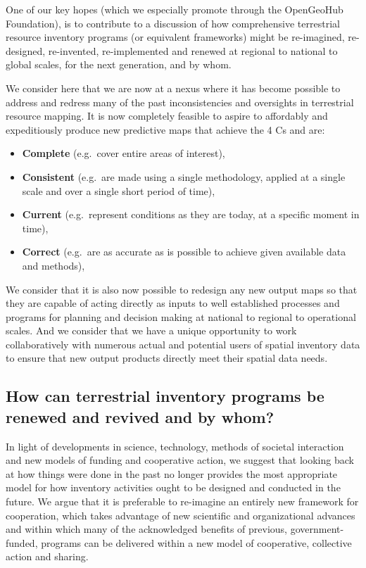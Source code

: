 \documentclass[graybox,natbib,nospthms,UStrade]{svmono}
\begin{document}
One of our key hopes (which we especially promote through the OpenGeoHub
Foundation), is to contribute to a discussion of how comprehensive
terrestrial resource inventory programs (or equivalent frameworks) might
be re-imagined, re-designed, re-invented, re-implemented and renewed at
regional to national to global scales, for the next generation, and by
whom.

We consider here that we are now at a nexus where it has become possible
to address and redress many of the past inconsistencies and oversights
in terrestrial resource mapping. It is now completely feasible to aspire
to affordably and expeditiously produce new predictive maps that achieve
the 4 Cs and are:

\begin{itemize}
\item
  \textbf{Complete} (e.g.~cover entire areas of interest),
\item
  \textbf{Consistent} (e.g.~are made using a single methodology, applied at a
  single scale and over a single short period of time),
\item
  \textbf{Current} (e.g.~represent conditions as they are today, at a specific
  moment in time),
\item
  \textbf{Correct} (e.g.~are as accurate as is possible to achieve given
  available data and methods),
\end{itemize}

We consider that it is also now possible to redesign any new output maps
so that they are capable of acting directly as inputs to well
established processes and programs for planning and decision making at
national to regional to operational scales. And we consider that we have
a unique opportunity to work collaboratively with numerous actual and
potential users of spatial inventory data to ensure that new output
products directly meet their spatial data needs.

\hypertarget{how-can-terrestrial-inventory-programs-be-renewed-and-revived-and-by-whom}{%
\subsection{How can terrestrial inventory programs be renewed and revived and by whom?}\label{how-can-terrestrial-inventory-programs-be-renewed-and-revived-and-by-whom}}

In light of developments in science, technology, methods of societal
interaction and new models of funding and cooperative action, we suggest
that looking back at how things were done in the past no longer provides
the most appropriate model for how inventory activities ought to be
designed and conducted in the future. We argue that it is preferable to
re-imagine an entirely new framework for cooperation, which takes
advantage of new scientific and organizational advances and within which
many of the acknowledged benefits of previous, government-funded,
programs can be delivered within a new model of cooperative, collective
action and sharing.
\end{document}
